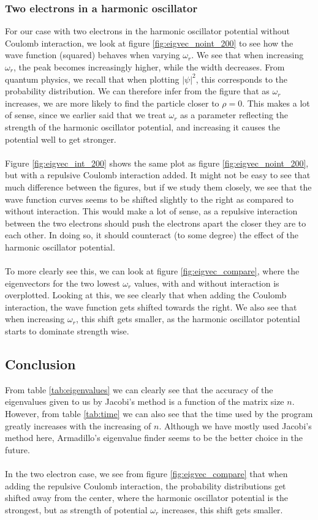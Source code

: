 \documentclass{article}
\begin{document}
\subsubsection{Two electrons in a harmonic oscillator}
For our case with two electrons in the harmonic oscillator potential without Coulomb interaction, we look at figure \ref{fig:eigvec_noint_200} to see how the wave function (squared) behaves when varying $\omega_r$. We see that when increasing $\omega_r$, the peak becomes increasingly higher, while the width decreases. From quantum physics, we recall that when plotting $|\psi|^2$, this corresponds to the probability distribution. We can therefore infer from the figure that as $\omega_r$ increases, we are more likely to find the particle closer to $\rho = 0$. This makes a lot of sense, since we earlier said that we treat $\omega_r$ as a parameter reflecting the strength of the harmonic oscillator potential, and increasing it causes the potential well to get stronger.\\\\
Figure \ref{fig:eigvec_int_200} shows the same plot as figure \ref{fig:eigvec_noint_200}, but with a repulsive Coulomb interaction added. It might not be easy to see that much difference between the figures, but if we study them closely, we see that the wave function curves seems to be shifted slightly to the right as compared to without interaction. This would make a lot of sense, as a repulsive interaction between the two electrons should push the electrons apart the closer they are to each other. In doing so, it should counteract (to some degree) the effect of the harmonic oscillator potential.\\\\
To more clearly see this, we can look at figure \ref{fig:eigvec_compare}, where the eigenvectors for the two lowest $\omega_r$ values, with and without interaction is overplotted. Looking at this, we see clearly that when adding the Coulomb interaction, the wave function gets shifted towards the right. We also see that when increasing $\omega_r$, this shift gets smaller, as the harmonic oscillator potential starts to dominate strength wise.
\subsection{Conclusion}
From table \ref{tab:eigenvalues} we can clearly see that the accuracy of the eigenvalues given to us by Jacobi's method is a function of the matrix size $n$. However, from table \ref{tab:time} we can also see that the time used by the program greatly increases with the increasing of $n$. Although we have mostly used Jacobi's method here, Armadillo's eigenvalue finder seems to be the better choice in the future.\\\\
In the two electron case, we see from figure \ref{fig:eigvec_compare} that when adding the repulsive Coulomb interaction, the probability distributions get shifted away from the center, where the harmonic oscillator potential is the strongest, but as strength of potential $\omega_r$ increases, this shift gets smaller.

\end{document}
